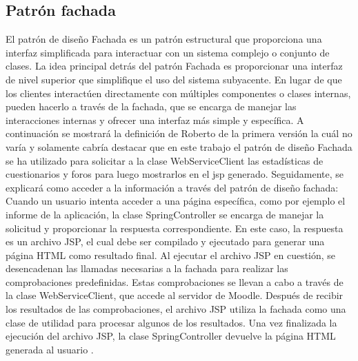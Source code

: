 \subsection{Patrón fachada}
El patrón de diseño Fachada es un patrón estructural que proporciona una interfaz simplificada para interactuar con un sistema complejo o conjunto de clases. La idea principal detrás del patrón Fachada es proporcionar una interfaz de nivel superior que simplifique el uso del sistema subyacente. En lugar de que los clientes interactúen directamente con múltiples componentes o clases internas, pueden hacerlo a través de la fachada, que se encarga de manejar las interacciones internas y ofrecer una interfaz más simple y específica.
A continuación se mostrará la definición de Roberto de la primera versión la cuál no varía y solamente cabría destacar que en este trabajo el patrón de diseño Fachada se ha utilizado para solicitar a la clase WebServiceClient las estadísticas de cuestionarios y foros para luego mostrarlos en el jsp generado.
Seguidamente, se explicará como acceder a la información a través del patrón de diseño fachada:
Cuando un usuario intenta acceder a una página específica, como por ejemplo el informe de la aplicación, la clase SpringController se encarga de manejar la solicitud y proporcionar la respuesta correspondiente. En este caso, la respuesta es un archivo JSP, el cual debe ser compilado y ejecutado para generar una página HTML como resultado final. Al ejecutar el archivo JSP en cuestión, se desencadenan las llamadas necesarias a la fachada para realizar las comprobaciones predefinidas. Estas comprobaciones se llevan a cabo a través de la clase WebServiceClient, que accede al servidor de Moodle. Después de recibir los resultados de las comprobaciones, el archivo JSP utiliza la fachada como una clase de utilidad para procesar algunos de los resultados. Una vez finalizada la ejecución del archivo JSP, la clase SpringController devuelve la página HTML generada al usuario \cite{previotfganexos}.